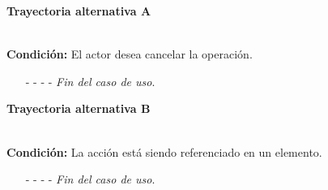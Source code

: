 \hypertarget{CU11-1-1-3:TAA}{\textbf{Trayectoria alternativa A}}\\
\noindent \textbf{Condición:} El actor desea cancelar la operación.
\begin{enumerate}
	\UCpaso[\UCactor] Oprime el botón  de la pantalla emergente.
	\UCpaso[\UCsist] Muestra la pantalla .
	\item[- -] - - {\em {Fin del caso de uso}}.%
\end{enumerate}	
\hypertarget{CU11-1-1-3:TAB}{\textbf{Trayectoria alternativa B}}\\
\noindent \textbf{Condición:} La acción está siendo referenciado en un elemento.
\begin{enumerate}
	\UCpaso[\UCsist] Muestra la pantalla  con el mensaje .
	\item[- -] - - {\em {Fin del caso de uso}}.%
\end{enumerate}
	

